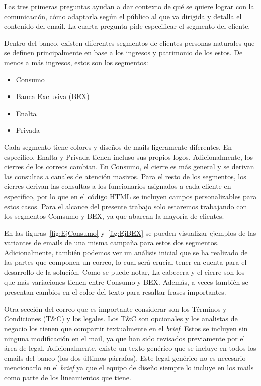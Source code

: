 Las tres primeras preguntas ayudan a dar contexto de qué se quiere lograr con la comunicación, cómo adaptarla según el público al que va dirigida y detalla el contenido del email. La cuarta pregunta pide especificar el segmento del cliente.

Dentro del banco, existen diferentes segmentos de clientes personas naturales que se definen principalmente en base a los ingresos y patrimonio de los estos. De menos a más ingresos, estos son los segmentos: 
\begin{itemize}
    \item Consumo
    \item Banca Exclusiva (BEX)
    \item Enalta
    \item Privada
\end{itemize}

Cada segmento tiene colores y diseños de mails ligeramente diferentes. En específico, Enalta y Privada tienen incluso sus propios logos. Adicionalmente, los cierres de los correos cambian. En Consumo, el cierre es más general y se derivan las consultas a canales de atención masivos. Para el resto de los segmentos, los cierres derivan las consultas a los funcionarios asignados a cada cliente en específico, por lo que en el código HTML se incluyen campos personalizables para estos casos. Para el alcance del presente trabajo solo estaremos trabajando con los segmentos Comsumo y BEX, ya que abarcan la mayoría de clientes. 

En las figuras~\ref{fig:EjConsumo} y~\ref{fig:EjBEX} se pueden visualizar ejemplos de las variantes de emails de una misma campaña para estos dos segmentos. Adicionalmente, también podemos ver un análisis inicial que se ha realizado de las partes que componen un correo, lo cual será crucial tener en cuenta para el desarrollo de la solución. Como se puede notar, La cabecera y el cierre son los que más variaciones tienen entre Consumo y BEX. Además, a veces también se presentan cambios en el color del texto para resaltar frases importantes.

Otra sección del correo que es importante considerar son los Términos y Condiciones (T\&C) y los legales. Los T\&C son opcionales y los analistas de negocio los tienen que compartir textualmente en el \textit{brief}. Estos se incluyen sin ninguna modificación en el mail, ya que han sido revisados previamente por el área de legal. Adicionalmente, existe un texto genérico que se incluye en todos los emails del banco (los dos últimos párrafos). Este legal genérico no es necesario mencionarlo en el \textit{brief} ya que el equipo de diseño siempre lo incluye en los mails como parte de los lineamientos que tiene. 

